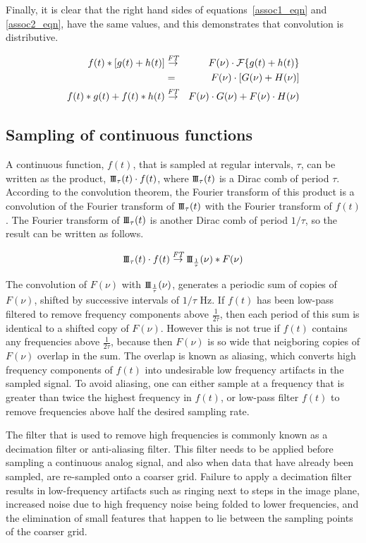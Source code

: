\documentclass[12pt,twoside,a4paper]{article}
\newcommand{\sha}{\mbox{\small I\!I\!I}}
\newcommand{\ft}{\mathcal{F}}
\newcommand{\ftarrow}{\stackrel{\mbox{\scriptsize\it FT}}{\rightarrow}}
\begin{document}
Finally, it is clear that the right hand sides of
equations~\ref{assoc1_eqn} and \ref{assoc2_eqn}, have the same values,
and this demonstrates that convolution is distributive.

\begin{eqnarray}
f(t) \ast [g(t) + h(t)] &\ftarrow& F(\nu)\cdot \ft\{g(t)+h(t)\}
\nonumber \\
\label{assoc1_eqn}
                               &=& F(\nu)\cdot [ G(\nu) + H(\nu) ]\\
\label{assoc2_eqn}
f(t) \ast g(t) + f(t) \ast h(t) &\ftarrow& F(\nu)\cdot G(\nu) +
F(\nu)\cdot H(\nu)
\end{eqnarray}

\subsection{Sampling of continuous functions}
\label{sampling}
A continuous function, $f(t)$, that is sampled at regular intervals,
$\tau$, can be written as the product, $\sha_{\tau}(t) \cdot f(t)$,
where $\sha_{\tau}(t)$ is a Dirac comb of period $\tau$.  According to
the convolution theorem, the Fourier transform of this product is a
convolution of the Fourier transform of $\sha_{\tau}(t)$ with the
Fourier transform of $f(t)$.  The Fourier transform of
$\sha_{\tau}(t)$ is another Dirac comb of period $1/\tau$, so the
result can be written as follows.

\begin{equation}
  \sha_{\tau}(t) \cdot f(t) \ftarrow \sha_{\frac{1}{\tau}}(\nu) \ast F(\nu)
\end{equation}

The convolution of $F(\nu)$ with $\sha_{\frac{1}{\tau}}(\nu)$,
generates a periodic sum of copies of $F(\nu)$, shifted by successive
intervals of $1/\tau$ Hz. If $f(t)$ has been low-pass filtered to
remove frequency components above $\frac{1}{2\tau}$, then each period
of this sum is identical to a shifted copy of $F(\nu)$. However this
is not true if $f(t)$ contains any frequencies above
$\frac{1}{2\tau}$, because then $F(\nu)$ is so wide that neigboring
copies of $F(\nu)$ overlap in the sum. The overlap is known as
aliasing, which converts high frequency components of $f(t)$ into
undesirable low frequency artifacts in the sampled signal. To avoid
aliasing, one can either sample at a frequency that is greater than
twice the highest frequency in $f(t)$, or low-pass filter $f(t)$ to
remove frequencies above half the desired sampling rate.

The filter that is used to remove high frequencies is commonly known
as a decimation filter or anti-aliasing filter. This filter needs to
be applied before sampling a continuous analog signal, and also when
data that have already been sampled, are re-sampled onto a coarser
grid. Failure to apply a decimation filter results in low-frequency
artifacts such as ringing next to steps in the image plane, increased
noise due to high frequency noise being folded to lower frequencies,
and the elimination of small features that happen to lie between the
sampling points of the coarser grid.
\end{document}
